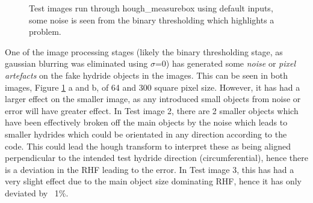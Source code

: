 \documentclass{article}
\begin{document}
    \begin{figure}[h]
        \centering
        \hfill
        \caption{Test images run through hough\_measurebox using default inputs, some noise is seen from the binary thresholding which highlights a problem.}
    \label{TestImagesProcessed}
    \end{figure}

    One of the image processing stages (likely the binary thresholding stage, as gaussian blurring was eliminated using $\sigma$=0) has generated some \textit{noise} or \textit{pixel artefacts} on the fake hydride objects in the images. This can be seen in both images, Figure \ref{TestImagesProcessed} a and b, of 64 and 300 square pixel size. However, it has had a larger effect on the smaller image, as any introduced small objects from noise or error will have greater effect. In Test image 2, there are 2 smaller objects which have been effectively broken off the main objects by the noise which leads to smaller hydrides which could be orientated in any direction according to the code. This could lead the hough transform to interpret these as being aligned perpendicular to the intended test hydride direction (circumferential), hence there is a deviation in the RHF leading to the error. In Test image 3, this has had a very slight effect due to the main object size dominating RHF, hence it has only deviated by ~1\%. 
\end{document}
